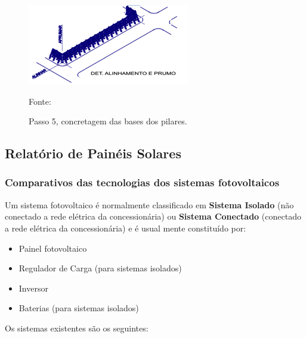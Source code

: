 \begin{figure}[H]
	\centering
	\label{ConcretagemBasesPilares}
		\includegraphics[keepaspectratio=true,scale=0.8]{figuras/ConcretagemBasesPilares.png}
	\caption{Passo 5, concretagem das bases dos pilares.}
	\small{Fonte: \cite{CatalogoCercamento}}
\end{figure}

\subsection{Relat\'orio de Pain\'eis Solares}

\subsubsection{Comparativos das tecnologias dos sistemas fotovoltaicos}

Um sistema fotovoltaico \'e normalmente classificado em \textbf{Sistema Isolado}  (n\~ao conectado a rede el\'etrica da concession\'aria) ou \textbf{Sistema Conectado}  (conectado a rede el\'etrica da concession\'aria) e \'e usual mente constitu\'ido por:

 \begin{itemize}
        \item Painel fotovoltaico
	\item Regulador de Carga		(para sistemas isolados)
	\item Inversor
	\item Baterias	(para sistemas isolados)
\end{itemize}

Os sistemas existentes s\~ao os seguintes:

